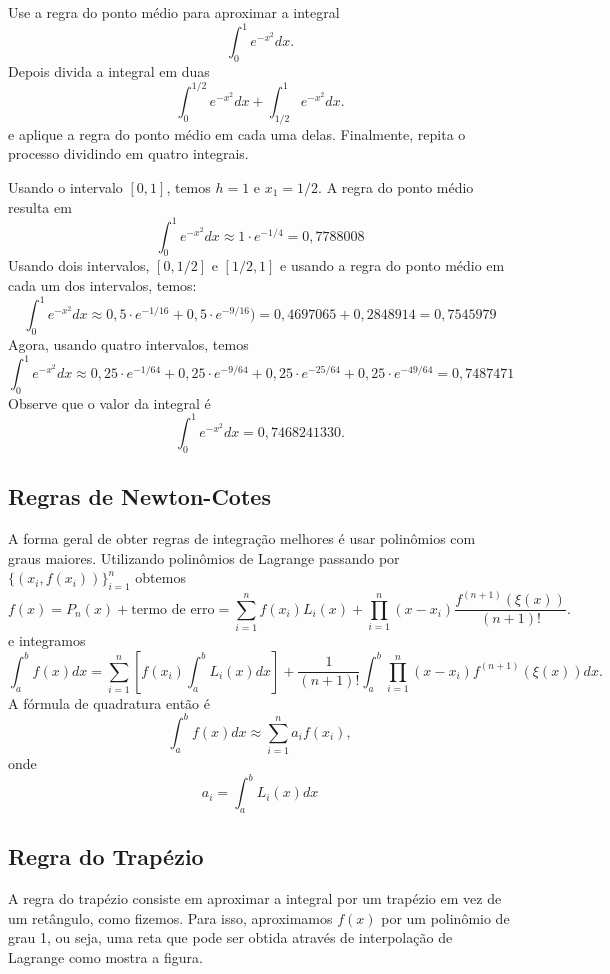 \begin{ex}
Use a regra do ponto médio para aproximar a integral
$$
\int_0^1e^{-x^2}dx.
$$
Depois divida a integral em duas
$$
\int_0^{1/2}e^{-x^2}dx+\int_{1/2}^{1}e^{-x^2}dx.
$$
e aplique a regra do ponto médio em cada uma delas. Finalmente, repita o processo dividindo em quatro integrais.

Usando o intervalo $[0,1]$, temos $h=1$ e $x_1=1/2$. A regra do ponto médio resulta em
$$
\int_0^1e^{-x^2}dx\approx 1\cdot e^{-1/4}=0,7788008
$$
Usando dois intervalos, $[0,1/2]$ e $[1/2,1]$ e usando a regra do ponto médio em cada um dos intervalos, temos:
$$
\int_0^1e^{-x^2}dx\approx 0,5\cdot e^{-1/16}+0,5\cdot e^{-9/16})=0,4697065+0,2848914=0,7545979
$$
Agora, usando quatro intervalos, temos
$$
\int_0^1e^{-x^2}dx\approx 0,25\cdot e^{-1/64}+0,25\cdot e^{-9/64}+0,25\cdot e^{-25/64}+0,25\cdot e^{-49/64}=0,7487471
$$
Observe que o valor da integral é
$$
\int_0^1e^{-x^2}dx=0,7468241330.
$$
\end{ex}

\subsection{Regras de Newton-Cotes}

A forma geral de obter regras de integração melhores é usar polinômios com graus maiores. Utilizando polinômios de Lagrange passando por $\{(x_i,f(x_i))\}_{i=1}^n$ obtemos
$$
f(x)=P_n(x)+\text{termo de erro}=\sum_{i=1}^nf(x_i)L_i(x) +\prod_{i=1}^n(x-x_i)\frac{f^{(n+1)}(\xi(x))}{(n+1)!}.
$$
e integramos
$$
\int_a^bf(x)dx=\sum_{i=1}^n\left[f(x_i)\int_a^bL_i(x)dx\right] +\frac{1}{(n+1)!}\int_a^b\prod_{i=1}^n(x-x_i)f^{(n+1)}(\xi(x))dx.
$$
A fórmula de quadratura então é
$$
\int_a^bf(x)dx\approx\sum_{i=1}^na_if(x_i),
$$
onde
$$
a_i=\int_a^b L_i(x)dx
$$

\subsection{Regra do Trapézio}

A regra do trapézio consiste em aproximar a integral por um trapézio em vez de um retângulo, como fizemos. Para isso, aproximamos $f(x)$ por um polinômio de grau 1, ou seja, uma reta que pode ser obtida através de interpolação de Lagrange como mostra a figura.

